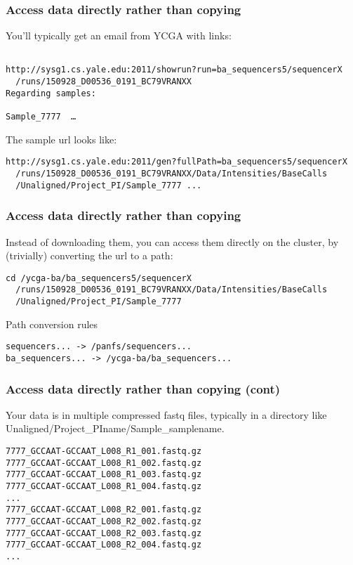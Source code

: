\documentclass[10pt]{beamer}
\begin{document}
\begin{frame}[fragile]
\frametitle{Access data directly rather than copying}

You'll typically get an email from YCGA with links:

\begin{verbatim}

http://sysg1.cs.yale.edu:2011/showrun?run=ba_sequencers5/sequencerX 
  /runs/150928_D00536_0191_BC79VRANXX 
Regarding samples:

Sample_7777  …
\end{verbatim}

The sample url looks like:

\begin{verbatim}
http://sysg1.cs.yale.edu:2011/gen?fullPath=ba_sequencers5/sequencerX
  /runs/150928_D00536_0191_BC79VRANXX/Data/Intensities/BaseCalls
  /Unaligned/Project_PI/Sample_7777 ...

\end{verbatim}
\end{frame}


\begin{frame}[fragile]
\frametitle{Access data directly rather than copying}

Instead of downloading them, you can access them directly on the cluster, by (trivially) 
converting the url to a path:

\begin{verbatim}
cd /ycga-ba/ba_sequencers5/sequencerX
  /runs/150928_D00536_0191_BC79VRANXX/Data/Intensities/BaseCalls
  /Unaligned/Project_PI/Sample_7777
\end{verbatim}

Path conversion rules
\begin{verbatim}
sequencers... -> /panfs/sequencers...
ba_sequencers... -> /ycga-ba/ba_sequencers...
\end{verbatim}

\end{frame}

\begin{frame}[fragile]
\frametitle{Access data directly rather than copying (cont)}

Your data is in multiple compressed fastq files, typically in a directory
like Unaligned/Project\_PIname/Sample\_samplename.  

\begin{verbatim}
7777_GCCAAT-GCCAAT_L008_R1_001.fastq.gz
7777_GCCAAT-GCCAAT_L008_R1_002.fastq.gz
7777_GCCAAT-GCCAAT_L008_R1_003.fastq.gz
7777_GCCAAT-GCCAAT_L008_R1_004.fastq.gz
...
7777_GCCAAT-GCCAAT_L008_R2_001.fastq.gz
7777_GCCAAT-GCCAAT_L008_R2_002.fastq.gz
7777_GCCAAT-GCCAAT_L008_R2_003.fastq.gz
7777_GCCAAT-GCCAAT_L008_R2_004.fastq.gz
...
\end{verbatim}
\end{frame}
\end{document}
